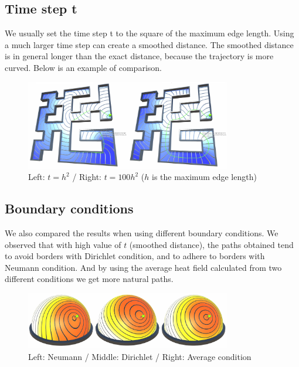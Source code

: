 \documentclass[a4paper,12pt,twoside]{article}
\begin{document}
\subsection{Time step t}

We usually set the time step t to the square of the maximum edge length. Using a much larger time step can create a smoothed distance. The smoothed distance is in general longer than the exact distance, because the trajectory is more curved. Below is an example of comparison.

\begin{figure}[htb]
	\centering
	\includegraphics[width=0.8\textwidth]{P8.png}
	\caption{Left: $t=h^2$ / Right: $t=100h^2$ ($h$ is the maximum edge length)}
\end{figure}


\subsection{Boundary conditions}

We also compared the results when using different boundary conditions. We observed that with high value of $t$ (smoothed distance), the paths obtained tend to avoid borders with Dirichlet condition, and to adhere to borders with Neumann condition. And by using the average heat field calculated from two different conditions we get more natural paths.

\begin{figure}[htb]
	\centering
	\includegraphics[width=0.8\textwidth]{P5.png}
	\caption{Left: Neumann / Middle: Dirichlet / Right: Average condition}
\end{figure}
\end{document}
